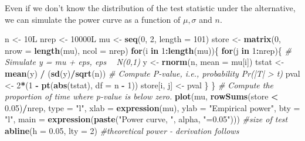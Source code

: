 \documentclass[]{book}
\newenvironment{Shaded}{\begin{snugshade}}{\end{snugshade}}
\newcommand{\CommentTok}[1]{\textcolor[rgb]{0.56,0.35,0.01}{\textit{#1}}}
\newcommand{\ControlFlowTok}[1]{\textcolor[rgb]{0.13,0.29,0.53}{\textbf{#1}}}
\newcommand{\DataTypeTok}[1]{\textcolor[rgb]{0.13,0.29,0.53}{#1}}
\newcommand{\DecValTok}[1]{\textcolor[rgb]{0.00,0.00,0.81}{#1}}
\newcommand{\FloatTok}[1]{\textcolor[rgb]{0.00,0.00,0.81}{#1}}
\newcommand{\KeywordTok}[1]{\textcolor[rgb]{0.13,0.29,0.53}{\textbf{#1}}}
\newcommand{\NormalTok}[1]{#1}
\newcommand{\OperatorTok}[1]{\textcolor[rgb]{0.81,0.36,0.00}{\textbf{#1}}}
\newcommand{\StringTok}[1]{\textcolor[rgb]{0.31,0.60,0.02}{#1}}
\theoremstyle{definition}
\theoremstyle{definition}
\theoremstyle{definition}
\theoremstyle{remark}
\begin{document}
Even if we don't know the distribution of the test statistic under the
alternative, we can simulate the power curve as a function of
\(\mu, \sigma\) and \(n\).

\begin{Shaded}
\begin{Highlighting}[]
\NormalTok{n <-}\StringTok{ }\NormalTok{10L}
\NormalTok{nrep <-}\StringTok{ }\NormalTok{10000L}
\NormalTok{mu <-}\StringTok{ }\KeywordTok{seq}\NormalTok{(}\DecValTok{0}\NormalTok{, }\DecValTok{2}\NormalTok{, }\DataTypeTok{length =} \DecValTok{101}\NormalTok{)}
\NormalTok{store <-}\StringTok{ }\KeywordTok{matrix}\NormalTok{(}\DecValTok{0}\NormalTok{, }\DataTypeTok{nrow =} \KeywordTok{length}\NormalTok{(mu), }\DataTypeTok{ncol =}\NormalTok{ nrep)}
\ControlFlowTok{for}\NormalTok{(i }\ControlFlowTok{in} \DecValTok{1}\OperatorTok{:}\KeywordTok{length}\NormalTok{(mu))\{}
  \ControlFlowTok{for}\NormalTok{(j }\ControlFlowTok{in} \DecValTok{1}\OperatorTok{:}\NormalTok{nrep)\{}
    \CommentTok{# Simulate y = mu + eps, eps ~ N(0,1)}
\NormalTok{    y <-}\StringTok{ }\KeywordTok{rnorm}\NormalTok{(n, }\DataTypeTok{mean =}\NormalTok{ mu[i])}
\NormalTok{    tstat <-}\StringTok{ }\KeywordTok{mean}\NormalTok{(y) }\OperatorTok{/}\StringTok{ }\NormalTok{(}\KeywordTok{sd}\NormalTok{(y)}\OperatorTok{/}\KeywordTok{sqrt}\NormalTok{(n))}
    \CommentTok{# Compute P-value, i.e., probability Pr(|T| > t)}
\NormalTok{    pval <-}\StringTok{ }\DecValTok{2}\OperatorTok{*}\NormalTok{(}\DecValTok{1} \OperatorTok{-}\StringTok{ }\KeywordTok{pt}\NormalTok{(}\KeywordTok{abs}\NormalTok{(tstat), }\DataTypeTok{df =}\NormalTok{ n }\OperatorTok{-}\StringTok{ }\DecValTok{1}\NormalTok{))}
\NormalTok{    store[i, j] <-}\StringTok{ }\NormalTok{pval}
\NormalTok{  \}}
\NormalTok{\}}
\CommentTok{# Compute the proportion of time where p-value is below zero.}
\KeywordTok{plot}\NormalTok{(mu, }\KeywordTok{rowSums}\NormalTok{(store }\OperatorTok{<}\StringTok{ }\FloatTok{0.05}\NormalTok{)}\OperatorTok{/}\NormalTok{nrep,}
     \DataTypeTok{type =} \StringTok{"l"}\NormalTok{, }\DataTypeTok{xlab =} \KeywordTok{expression}\NormalTok{(mu), }
     \DataTypeTok{ylab =} \StringTok{"Empirical power"}\NormalTok{, }\DataTypeTok{bty =} \StringTok{"l"}\NormalTok{,}
     \DataTypeTok{main =} \KeywordTok{expression}\NormalTok{(}\KeywordTok{paste}\NormalTok{(}\StringTok{"Power curve, "}\NormalTok{, alpha, }\StringTok{"=0.05"}\NormalTok{)))}
\CommentTok{#size of test}
\KeywordTok{abline}\NormalTok{(}\DataTypeTok{h =} \FloatTok{0.05}\NormalTok{, }\DataTypeTok{lty =} \DecValTok{2}\NormalTok{)}
\CommentTok{#theoretical power - derivation follows }

\end{Highlighting}
\end{Shaded}
\end{document}
